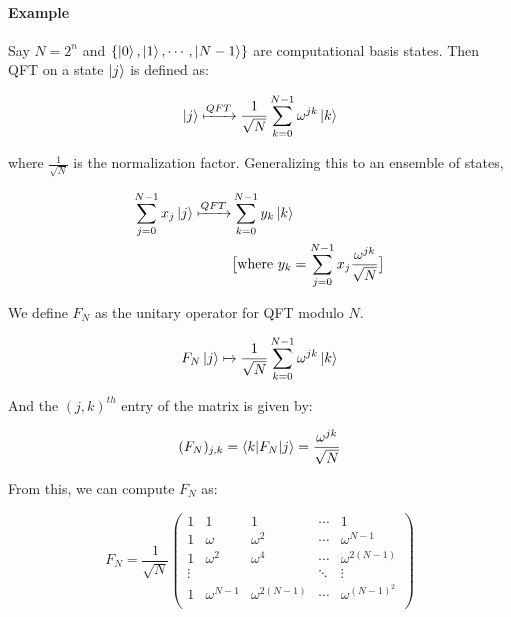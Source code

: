 \documentclass[11.5pt, paper=a4]{article}
\theoremstyle{definition}
\numberwithin{theorem}{section}
\begin{document}
\paragraph{Example}
Say $N = 2^n$ and $\{ \ket{0}, \ket{1}, \cdots, \ket{N-1} \}$ are computational basis states. Then
QFT on a state $\ket{j}$ is defined as:

\[
    \ket{j} \xmapsto{QFT} \displaystyle \frac{1}{\sqrt{N}} \sum_{k=0}^{N-1} \omega^{jk} \ket{k}
\]

where $\displaystyle \frac{1}{\sqrt{N}}$ is the normalization factor. Generalizing this to an ensemble of states,

\begin{align}
    \sum_{j=0}^{N-1} x_j\ket{j} \xmapsto{QFT} & \sum_{k=0}^{N-1} y_k \ket{k}                   \\
                                              & \big[ \text{where } y_k = \sum_{j=0}^{N-1} x_j
        \frac{\omega^{jk}}{\sqrt{N}} \big] \nonumber
\end{align}


We define $F_N$ as the unitary operator for QFT modulo $N$.

\[
    F_N\ket{j} \xmapsto{} \displaystyle \frac{1}{\sqrt{N}} \sum_{k=0}^{N-1} \omega^{jk} \ket{k}
\]

And the $(j, k)^{th}$ entry of the matrix is given by:

\[
    (F_N)_{j,k} = \braket{k|F_N|j} = \displaystyle \frac{\omega^{jk}}{\sqrt{N}}
\]

From this, we can compute $F_N$ as:

\[
    F_N = \displaystyle \frac{1}{\sqrt{N}} \begin{pmatrix}
        1      & 1            & 1               & \cdots & 1                \\
        1      & \omega       & \omega^2        & \cdots & \omega^{N-1}     \\
        1      & \omega^2     & \omega^4        & \cdots & \omega^{2(N-1)}  \\
        \vdots &              &                 & \ddots & \vdots           \\
        1      & \omega^{N-1} & \omega^{2(N-1)} & \cdots & \omega^{(N-1)^2} \\
    \end{pmatrix}
\]
\end{document}
